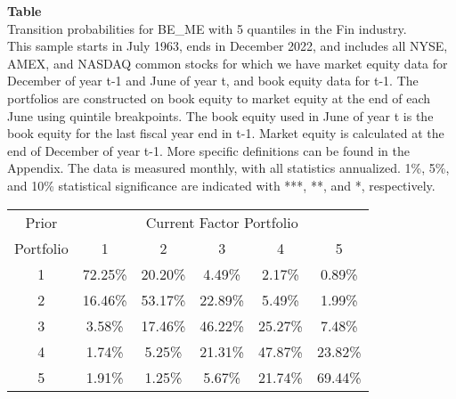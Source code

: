 \begin{table*}[ht!]
\raggedright
{}
\label{tab: transition_probs_BE_ME_Fin_with_5_quantiles}
\textbf{Table \thetable} \\
Transition probabilities for BE_ME with 5 quantiles in the Fin industry. \\
\hspace*{1em}This sample starts in July 1963, ends in December 2022, and includes all NYSE, AMEX, and NASDAQ common stocks for which we have market equity data for December of year t-1 and June of year t, and book equity data for t-1. The portfolios are constructed on book equity to market equity at the end of each June using quintile breakpoints.  The book equity used in June of year t is the book equity for the last fiscal year end in t-1.  Market equity is calculated at the end of December of year t-1.  More specific definitions can be found in the Appendix.  The data is measured monthly, with all statistics annualized.  1\%, 5\%, and 10\% statistical significance are indicated with ***, **, and *, respectively. \\
\vspace{0.5em}
\centering
\begin{adjustbox}{max width=\textwidth}
\begin{tabular}{@{}cccccc@{}}
\toprule
Prior & \multicolumn{5}{c}{Current Factor Portfolio} \\
Portfolio & 1 & 2 & 3 & 4 & 5 \\
\midrule
1 & 72.25\% & 20.20\% & 4.49\% & 2.17\% & 0.89\% \\
2 & 16.46\% & 53.17\% & 22.89\% & 5.49\% & 1.99\% \\
3 & 3.58\% & 17.46\% & 46.22\% & 25.27\% & 7.48\% \\
4 & 1.74\% & 5.25\% & 21.31\% & 47.87\% & 23.82\% \\
5 & 1.91\% & 1.25\% & 5.67\% & 21.74\% & 69.44\% \\
\bottomrule
\end{tabular}
\end{adjustbox}
\end{table*}